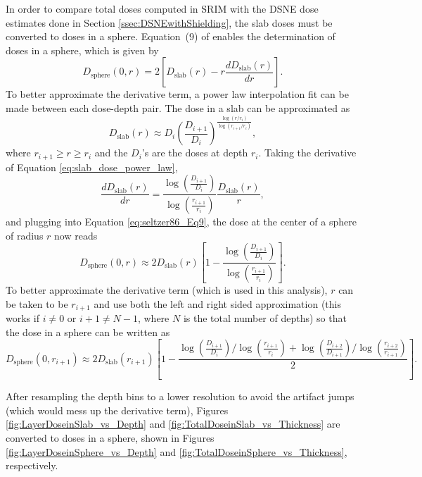 \documentclass{hitec}
\begin{document}
In order to compare total doses computed in SRIM with the DSNE dose estimates done in Section \ref{ssec:DSNEwithShielding}, the slab doses must be converted to doses in a sphere. Equation~(9) of \cite{seltzer1986conversion} enables the determination of doses in a sphere, which is given by
\begin{equation}\label{eq:seltzer86_Eq9}
D_{\text{sphere}}(0,r) = 2\left[D_{\text{slab}}(r) - r\frac{d D_{\text{slab}}(r)}{dr}\right].
\end{equation}
To better approximate the derivative term, a power law interpolation fit can be made between each dose-depth pair. The dose in a slab can be approximated as
\begin{equation}\label{eq:slab_dose_power_law}
D_{\text{slab}}(r) \approx D_i\left(\frac{D_{i+1}}{D_i}\right)^{\frac{\log(r/r_i)}{\log(r_{i+1}/r_i)}},
\end{equation}
where $r_{i+1} \ge r \ge r_i$ and the $D_i$'s are the doses at depth $r_i$. Taking the derivative of Equation \eqref{eq:slab_dose_power_law},
\begin{equation}
\frac{d D_{\text{slab}}(r)}{dr} = \frac{\log\left(\frac{D_{i+1}}{D_i}\right)}{\log\left(\frac{r_{i+1}}{r_i}\right)}\frac{D_{\text{slab}}(r)}{r},
\end{equation}
and plugging into Equation \eqref{eq:seltzer86_Eq9}, the dose at the center of a sphere of radius $r$ now reads
\begin{equation}\label{eq:seltzer86_Eq9-powerlawDose}
D_{\text{sphere}}(0,r) \approx 2 D_{\text{slab}}(r)\left[1 - \frac{\log\left(\frac{D_{i+1}}{D_i}\right)}{\log\left(\frac{r_{i+1}}{r_i}\right)}\right].
\end{equation}
To better approximate the derivative term (which is used in this analysis), $r$ can be taken to be $r_{i+1}$ and use both the left and right sided approximation (this works if $i\ne 0$ or $i+1\ne N-1$, where $N$ is the total number of depths) so that the dose in a sphere can be written as
\begin{equation}\label{eq:seltzer86_Eq9-powerlawDose2}
D_{\text{sphere}}(0,r_{i+1}) \approx 2 D_{\text{slab}}(r_{i+1})\left[1 - \frac{\log\left(\frac{D_{i+1}}{D_i}\right)/\log\left(\frac{r_{i+1}}{r_i}\right) + \log\left(\frac{D_{i+2}}{D_{i+1}}\right)/\log\left(\frac{r_{i+2}}{r_{i+1}}\right)}{2}\right].
\end{equation}

After resampling the depth bins to a lower resolution to avoid the artifact jumps (which would mess up the derivative term), Figures \ref{fig:LayerDoseinSlab_vs_Depth} and \ref{fig:TotalDoseinSlab_vs_Thickness} are converted to doses in a sphere, shown in Figures \ref{fig:LayerDoseinSphere_vs_Depth} and \ref{fig:TotalDoseinSphere_vs_Thickness}, respectively.
\end{document}

